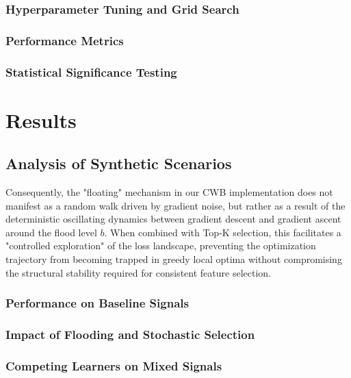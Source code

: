 \documentclass[fontsize=12 pt]{scrartcl}
\begin{document}
\subsubsection{Hyperparameter Tuning and Grid Search}
\subsubsection{Performance Metrics}
\subsubsection{Statistical Significance Testing}

\newpage
\section{Results}

\subsection{Analysis of Synthetic Scenarios}

Consequently, the "floating" mechanism in our CWB implementation does not manifest as a random walk driven by gradient noise, but rather as a result of the deterministic oscillating dynamics between gradient descent and gradient ascent around the flood level $b$. When combined with Top-K selection, this facilitates a "controlled exploration" of the loss landscape, preventing the optimization trajectory from becoming trapped in greedy local optima without compromising the structural stability required for consistent feature selection.

\subsubsection{Performance on Baseline Signals}
\subsubsection{Impact of Flooding and Stochastic Selection}
\subsubsection{Competing Learners on Mixed Signals}
\end{document}
